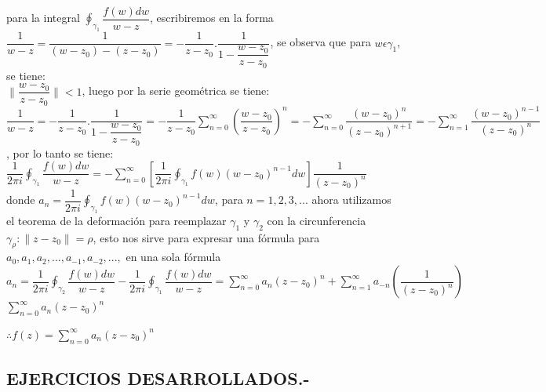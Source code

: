 \documentclass[10pt,a4paper]{article}
\begin{document}
para la integral $\displaystyle{\oint_{\gamma_1} \dfrac{f(w) dw}{w-z}}$, escribiremos en la forma \\
$\displaystyle{\dfrac{1}{w-z} = \dfrac{1}{(w-z_0)-(z-z_0)} = - \dfrac{1}{z-z_0}.\dfrac{1}{1-\dfrac{w-z_0}{z-z_0}}}$, se observa que para $w \epsilon \gamma_1$, se tiene: \\
$\displaystyle{\parallel \dfrac{w-z_0}{z-z_0} \parallel < 1}$, luego por la serie geométrica se tiene: \\
$\displaystyle{\dfrac{1}{w-z} = - \dfrac{1}{z-z_0}.\dfrac{1}{1-\dfrac{w-z_0}{z-z_0}} = -\dfrac{1}{z-z_0} \sum_{n = 0}^{\infty} (\dfrac{w-z_0}{z-z_0})^n = - \sum_{n = 0}^{\infty} \dfrac{(w-z_0)^n}{(z-z_0)^{n+1}} = - \sum_{n = 1}^{\infty} \dfrac{(w-z_0)^{n-1}}{(z-z_0)^{n}} }$, por lo tanto se tiene:\\
$\displaystyle{\dfrac{1}{2 \pi i} \oint_{\gamma_1} \dfrac{f(w)dw}{w-z} = -\sum_{n = 0}^{\infty} [\dfrac{1}{2 \pi i} \oint_{\gamma_1} f(w)(w-z_0)^{n-1}dw] \dfrac{1}{(z-z_0)^n}}$ \\
donde $\displaystyle{a_n = \dfrac{1}{2 \pi i} \oint_{\gamma_1} f(w) (w-z_0)^{n-1}dw }$, para $n = 1,2,3,...$ ahora utilizamos el teorema de la deformación para reemplazar $\gamma_1$ y $\gamma_2$ con la circunferencia $\gamma_\rho : \parallel z - z_0 \parallel = \rho$, esto nos sirve para expresar una fórmula para $a_0,a_1,a_2,...,a_{-1},a_{-2},...,$ en una sola fórmula\\
$\displaystyle{a_n = \dfrac{1}{2 \pi i} \oint_{\gamma_2} \dfrac{f(w)dw}{w-z} - \dfrac{1}{2 \pi i} \oint_{\gamma_1} \dfrac{f(w)dw}{w-z}= \sum_{n=0}^{\infty} a_n (z-z_0)^n + \sum_{n=1}^{\infty} a_{-n} (\dfrac{1}{(z-z_0)^n})}$\\
$\displaystyle{\sum_{n=0}^{\infty} a_n (z-z_0)^n}$\begin{center}
 $\displaystyle{\therefore f(z) = \sum_{n=0}^{\infty} a_n (z-z_0)^n}$
\end{center}
\subsection{EJERCICIOS DESARROLLADOS.-}
\end{document}
